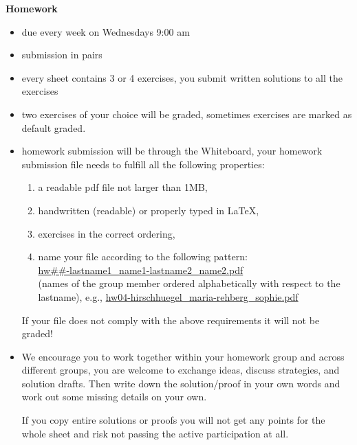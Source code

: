 \documentclass[11pt]{amsart}%
\begin{document}
\medskip
\noindent
\textbf{Homework}
\begin{itemize}
 \item due every week on Wednesdays 9:00 am
 \item submission in pairs
 \item every sheet contains 3 or 4 exercises, you submit written
   solutions to all the exercises 
 \item two exercises of your choice will be graded, sometimes exercises are marked as default graded.


 \item homework submission will be through the Whiteboard, 
    your  homework submission file needs to fulfill all the following properties:
 \begin{enumerate}
  \item a readable pdf file not larger than 1MB,
  \item handwritten (readable) or properly typed in LaTeX,
  \item exercises in the correct ordering,
  \item name your file according to the following pattern:\\
   \url{hw##-lastname1_name1-lastname2_name2.pdf}
  \\(names of the group member ordered alphabetically with respect to
  the lastname), e.g., 
  \url{hw04-hirschhuegel_maria-rehberg_sophie.pdf}
 \end{enumerate}
 If your file does not comply with the above requirements it will not be graded!
 \item  
  We encourage you to work together within your homework group and across different groups, you are welcome to exchange ideas, discuss strategies, and solution drafts.
  Then write down the solution/proof in your own words and work out some missing details on your own. 
  
  If you copy entire solutions or proofs you will not get any points for the whole sheet and risk not passing the active participation at all.
  
\end{itemize}
\end{document}
